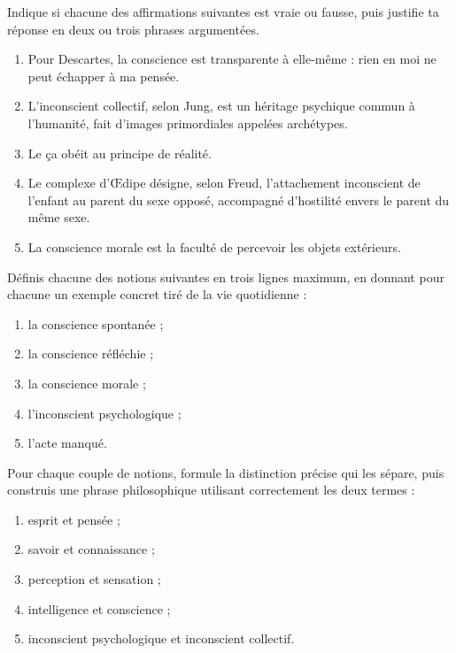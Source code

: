 \documentclass[11pt]{article}
\newcommand{\cle}[1]{{\popxbold\color{popdark}#1}}
\begin{document}
\begin{exercice}
Indique si chacune des affirmations suivantes est vraie ou fausse, puis justifie ta réponse en deux ou trois phrases argumentées.

\begin{enumerate}
\item Pour Descartes, la conscience est transparente à elle-même : rien en moi ne peut échapper à ma pensée.
\item L'inconscient collectif, selon Jung, est un héritage psychique commun à l'humanité, fait d'images primordiales appelées archétypes.
\item Le \cle{ça} obéit au principe de réalité.
\item Le complexe d'Œdipe désigne, selon Freud, l'attachement inconscient de l'enfant au parent du sexe opposé, accompagné d'hostilité envers le parent du même sexe.
\item La conscience morale est la faculté de percevoir les objets extérieurs.
\end{enumerate}
\end{exercice}

\begin{exercice}[Définitions]
Définis chacune des notions suivantes en trois lignes maximum, en donnant pour chacune un exemple concret tiré de la vie quotidienne :
\begin{enumerate}
\item la conscience spontanée ;
\item la conscience réfléchie ;
\item la conscience morale ;
\item l'inconscient psychologique ;
\item l'acte manqué.
\end{enumerate}
\end{exercice}

\begin{exercice}
Pour chaque couple de notions, formule la distinction précise qui les sépare, puis construis une phrase philosophique utilisant correctement les deux termes :
\begin{enumerate}
\item \cle{esprit} et \cle{pensée} ;
\item \cle{savoir} et \cle{connaissance} ;
\item \cle{perception} et \cle{sensation} ;
\item \cle{intelligence} et \cle{conscience} ;
\item \cle{inconscient psychologique} et \cle{inconscient collectif}.
\end{enumerate}
\end{exercice}
\end{document}
